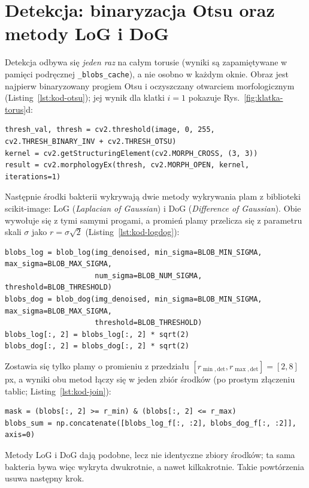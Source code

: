 \documentclass[12pt,a4paper,twoside,openright]{report}
\theoremstyle{definition}
\theoremstyle{remark}
\begin{document}
{\section{Detekcja: binaryzacja Otsu oraz metody LoG i DoG}
Detekcja odbywa się \emph{jeden raz} na całym torusie (wyniki są zapamiętywane w pamięci podręcznej \texttt{\_blobs\_cache}), a nie osobno w każdym oknie. Obraz jest najpierw binaryzowany progiem Otsu i oczyszczany otwarciem morfologicznym (Listing~\ref{lst:kod-otsu}); jej wynik dla klatki $i=1$ pokazuje Rys.~\ref{fig:klatka-torus}d:
\begin{lstlisting}[style=pykod,caption={Binaryzacja progiem Otsu i otwarcie morfologiczne},label={lst:kod-otsu}]
thresh_val, thresh = cv2.threshold(image, 0, 255, cv2.THRESH_BINARY_INV + cv2.THRESH_OTSU)
kernel = cv2.getStructuringElement(cv2.MORPH_CROSS, (3, 3))
result = cv2.morphologyEx(thresh, cv2.MORPH_OPEN, kernel, iterations=1)
\end{lstlisting}
Następnie środki bakterii wykrywają dwie metody wykrywania plam z biblioteki scikit-image: LoG (\emph{Laplacian of Gaussian}) i DoG (\emph{Difference of Gaussian}). Obie wywołuje się z tymi samymi progami, a promień plamy przelicza się z parametru skali $\sigma$ jako $r=\sigma\sqrt2$ (Listing~\ref{lst:kod-logdog}):
\begin{lstlisting}[style=pykod,caption={Wykrywanie środków bakterii metodami LoG i DoG},label={lst:kod-logdog}]
blobs_log = blob_log(img_denoised, min_sigma=BLOB_MIN_SIGMA, max_sigma=BLOB_MAX_SIGMA,
                     num_sigma=BLOB_NUM_SIGMA, threshold=BLOB_THRESHOLD)
blobs_dog = blob_dog(img_denoised, min_sigma=BLOB_MIN_SIGMA, max_sigma=BLOB_MAX_SIGMA,
                     threshold=BLOB_THRESHOLD)
blobs_log[:, 2] = blobs_log[:, 2] * sqrt(2)
blobs_dog[:, 2] = blobs_dog[:, 2] * sqrt(2)
\end{lstlisting}
Zostawia się tylko plamy o promieniu z przedziału $[r_{\min,\mathrm{det}},r_{\max,\mathrm{det}}]=[2,8]$ px, a wyniki obu metod łączy się w jeden zbiór środków (po prostym złączeniu tablic; Listing~\ref{lst:kod-join}):
\begin{lstlisting}[style=pykod,caption={Filtrowanie promieni plam i połączenie wyników LoG i DoG},label={lst:kod-join}]
mask = (blobs[:, 2] >= r_min) & (blobs[:, 2] <= r_max)
blobs_sum = np.concatenate([blobs_log_f[:, :2], blobs_dog_f[:, :2]], axis=0)
\end{lstlisting}
Metody LoG i DoG dają podobne, lecz nie identyczne zbiory środków; ta sama bakteria bywa więc wykryta dwukrotnie, a nawet kilkakrotnie. Takie powtórzenia usuwa następny krok.

}
\end{document}
